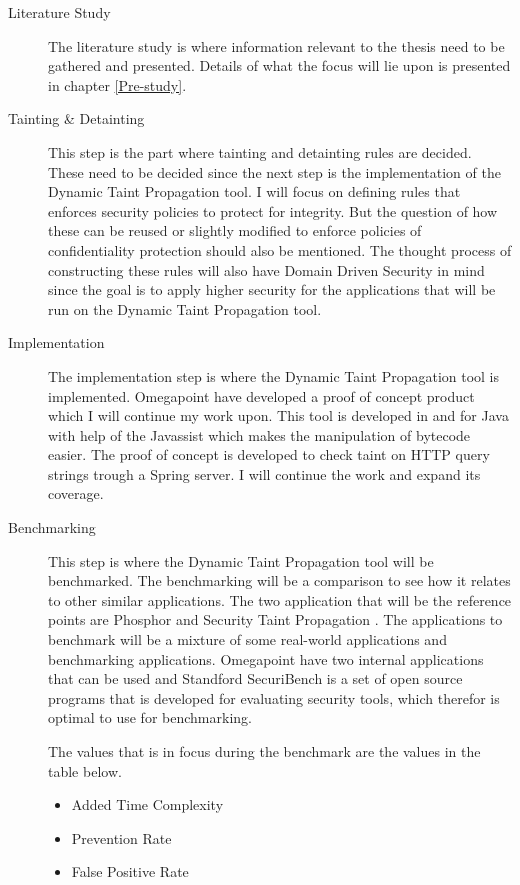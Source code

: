 \documentclass{../kththesis}
\begin{document}
\begin{description}  
	\item [Literature Study]
	The literature study is where information relevant to the thesis need to be gathered and presented. Details of what the focus will lie upon is presented in chapter \ref{Pre-study}.

	\item [Tainting \& Detainting]
	This step is the part where tainting and detainting rules are decided. These need to be decided since the next step is the implementation of the Dynamic Taint Propagation tool. I will focus on defining rules that enforces security policies to protect for integrity. But the question of how these can be reused or slightly modified to enforce policies of confidentiality protection should also be mentioned. The thought process of constructing these rules will also have Domain Driven Security in mind since the goal is to apply higher security for the applications that will be run on the Dynamic Taint Propagation tool. 

	\item [Implementation]
	The implementation step is where the Dynamic Taint Propagation tool is implemented. Omegapoint have developed a proof of concept product which I will continue my work upon. This tool is developed in and for Java with help of the Javassist \parencite{Javassist} which makes the manipulation of bytecode easier. The proof of concept is developed to check taint on HTTP query strings trough a Spring server. I will continue the work and expand its coverage.

	\item [Benchmarking]
	This step is where the Dynamic Taint Propagation tool will be benchmarked. The benchmarking will be a comparison to see how it relates to other similar applications. The two application that will be the reference points are Phosphor \parencite{phosphor} and Security Taint Propagation \parencite{securityTaint}. The applications to benchmark will be a mixture of some real-world applications and benchmarking applications. Omegapoint have two internal applications that can be used and Standford SecuriBench \parencite{securiBench} is a set of open source programs that is developed for evaluating security tools, which therefor is optimal to use for benchmarking.
	
	The values that is in focus during the benchmark are the values in the table below. 
	
	\begin{itemize}  
		\item Added Time Complexity		
		\item Prevention Rate 
		\item False Positive Rate
	\end{itemize}


\end{description}
\end{document}
